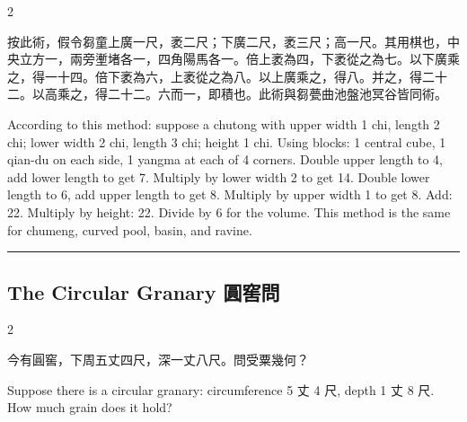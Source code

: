 \documentclass[10pt,a4paper]{article}
\newcommand{\longline}{\noindent\rule{\textwidth}{0.4pt}}
\begin{document}
\begin{paracol}{2}

\begin{leftcolumn*}
\begin{commentarybi}
按此術，假令芻童上廣一尺，袤二尺；下廣二尺，袤三尺；高一尺。其用棋也，中央立方一，兩旁壍堵各一，四角陽馬各一。倍上袤為四，下袤從之為七。以下廣乘之，得一十四。倍下袤為六，上袤從之為八。以上廣乘之，得八。并之，得二十二。以高乘之，得二十二。六而一，即積也。此術與芻甍曲池盤池冥谷皆同術。
\end{commentarybi}
\end{leftcolumn*}

\begin{rightcolumn*}
\begin{commentarybi}
According to this method: suppose a chutong with upper width 1 chi, length 2 chi; lower width 2 chi, length 3 chi; height 1 chi. Using blocks: 1 central cube, 1 qian-du on each side, 1 yangma at each of 4 corners. Double upper length to 4, add lower length to get 7. Multiply by lower width 2 to get 14. Double lower length to 6, add upper length to get 8. Multiply by upper width 1 to get 8. Add: 22. Multiply by height: 22. Divide by 6 for the volume. This method is the same for chumeng, curved pool, basin, and ravine.
\end{commentarybi}
\end{rightcolumn*}

\end{paracol}

\vspace{0.3cm}
\longline
\vspace{0.3cm}

\subsection{The Circular Granary 圓窖問}

\begin{paracol}{2}

\begin{leftcolumn*}
\begin{problembi}[\textbf{問} · 圓窖]
今有圓窖，下周五丈四尺，深一丈八尺。問受粟幾何？
\end{problembi}
\end{leftcolumn*}

\begin{rightcolumn*}
\begin{problembi}
Suppose there is a circular granary: circumference 5 丈 4 尺, depth 1 丈 8 尺. How much grain does it hold?
\end{problembi}
\end{rightcolumn*}

\end{paracol}
\end{document}
